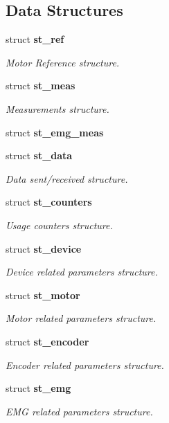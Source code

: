 \subsection*{Data Structures}
\begin{DoxyCompactItemize}
\item 
struct \textbf{ st\+\_\+ref}
\begin{DoxyCompactList}\small\item\em Motor Reference structure. \end{DoxyCompactList}\item 
struct \textbf{ st\+\_\+meas}
\begin{DoxyCompactList}\small\item\em Measurements structure. \end{DoxyCompactList}\item 
struct \textbf{ st\+\_\+emg\+\_\+meas}
\item 
struct \textbf{ st\+\_\+data}
\begin{DoxyCompactList}\small\item\em Data sent/received structure. \end{DoxyCompactList}\item 
struct \textbf{ st\+\_\+counters}
\begin{DoxyCompactList}\small\item\em Usage counters structure. \end{DoxyCompactList}\item 
struct \textbf{ st\+\_\+device}
\begin{DoxyCompactList}\small\item\em Device related parameters structure. \end{DoxyCompactList}\item 
struct \textbf{ st\+\_\+motor}
\begin{DoxyCompactList}\small\item\em Motor related parameters structure. \end{DoxyCompactList}\item 
struct \textbf{ st\+\_\+encoder}
\begin{DoxyCompactList}\small\item\em Encoder related parameters structure. \end{DoxyCompactList}\item 
struct \textbf{ st\+\_\+emg}
\begin{DoxyCompactList}\small\item\em E\+MG related parameters structure. \end{DoxyCompactList}\item 

\end{DoxyCompactItemize}
